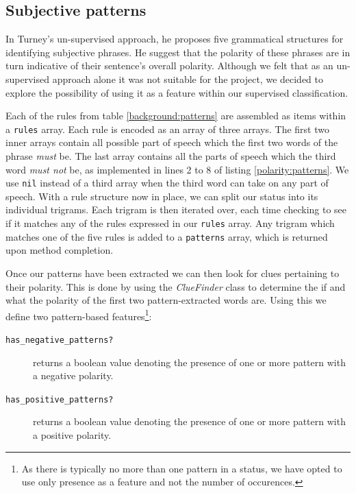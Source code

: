 \subsection{Subjective patterns}

In Turney's \cite{Turney:2002vv} un-supervised approach, he proposes five grammatical structures for identifying subjective phrases. He suggest that the polarity of these phrases are in turn indicative of their sentence's overall polarity. Although we felt that as an un-supervised approach alone it was not suitable for the project, we decided to explore the possibility of using it as a feature within our supervised classification.

Each of the rules from table \ref{background:patterns} are assembled as items within a \texttt{rules} array. Each rule is encoded as an array of three arrays. The first two inner arrays contain all possible part of speech which the first two words of the phrase \emph{must} be. The last array contains all the parts of speech which the third word \emph{must not} be, as implemented in lines 2 to 8 of listing \ref{polarity:patterns}. We use \texttt{nil} instead of a third array when the third word can take on any part of speech. With a rule structure now in place, we can split our status into its individual trigrams. Each trigram is then iterated over, each time checking to see if it matches any of the rules expressed in our \texttt{rules} array. Any trigram which matches one of the five rules is added to a \texttt{patterns} array, which is returned upon method completion.

Once our patterns have been extracted we can then look for clues pertaining to their polarity. This is done by using the \emph{ClueFinder} class to determine the if and what the polarity of the first two pattern-extracted words are. Using this we define two pattern-based features\footnote{As there is typically no more than one pattern in a status, we have opted to use only presence as a feature and not the number of occurences.}:

\begin{description}
	\item [\texttt{has\_negative\_patterns?}] returns a boolean value denoting the presence of one or more pattern with a negative polarity. 
	
	\item [\texttt{has\_positive\_patterns?}] returns a boolean value denoting the presence of one or more pattern with a positive polarity. 
\end{description}

